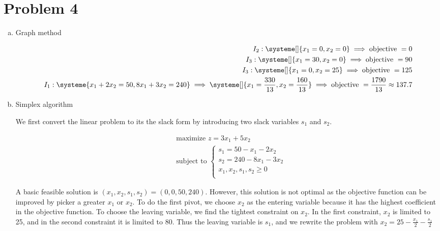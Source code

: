 \documentclass[a4paper, 10pt, twoside]{article}
\begin{document}
\section*{Problem 4}

\begin{enumerate}[a)]
    \item Graph method

          \begin{align*}
              I_2 :
              \systeme[]{
                  x_1 = 0,
                  x_2 = 0
              }
              \implies \text{objective } = 0                             \\
              I_3 :
              \systeme[]{
                  x_1 = 30,
                  x_2 = 0
              }
              \implies \text{objective } = 90                            \\
              I_3 :
              \systeme[]{
                  x_1 = 0,
                  x_2 = 25
              }
              \implies \text{objective } = 125                           \\
              I_1 :
              \systeme{
                  x_1+2x_2=50,
                  8x_1+3x_2=240
              }
              \implies
              \systeme[]{
                  x_1 = \frac{330}{13},
                  x_2 = \frac{160}{13}
              }
              \implies \text{objective } = \frac{1790}{13} \approx 137.7 \\
          \end{align*}

    \item Simplex algorithm

          We first convert the linear problem to its the slack form by introducing two slack variables $s_1$ and $s_2$.

          \begin{align*}
               & \text{maximize } z = 3x_1 + 5x_2 \\
               & \text{subject to }
              \begin{cases}
                  s_1 = 50 - x_1 - 2x_2    \\
                  s_2 = 240 - 8x_1 - 3x_2  \\
                  x_1, x_2, s_1, s_2 \ge 0 \\
              \end{cases}
          \end{align*}

          A basic feasible solution is $(x_1, x_2, s_1, s_2) = (0, 0, 50, 240)$. However, this solution is not optimal as the objective function can be improved by picker a greater $x_1$ or $x_2$. To do the first pivot, we choose $x_2$ as the entering variable because it has the highest coefficient in the objective function. To choose the leaving variable, we find the tightest constraint on $x_2$. In the first constraint, $x_2$ is limited to 25, and in the second constraint it is limited to 80. Thus the leaving variable is $s_1$, and we rewrite the problem with $x_2 = 25 - \frac{x_1}{2} - \frac{s_1}{2}$


\end{enumerate}
\end{document}
